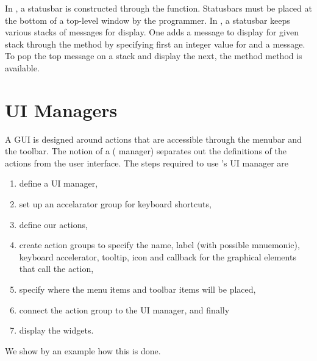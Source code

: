In \GTK, a statusbar is constructed through the
 function. Statusbars must be placed at the
bottom of a top-level window by the programmer. In \GTK, a statusbar
keeps various stacks of messages for display. One adds a message to
display for given stack through the  method
by specifying first an integer value for  and a
message. To pop the top message on a stack and display the next, the
method  method is available.


\section{UI Managers}
\label{sec:RGtk2:UIManager}


A GUI is designed around actions that are accessible through the
menubar and the toolbar. The notion of a 
( manager) separates out the definitions of the actions
from the user interface. The steps required to use \GTK's UI manager
are 
\begin{enumerate}
\item define a UI manager,
\item  set up an accelarator group for
keyboard shortcuts,
\item define our actions,
\item create action groups to
specify the name, label (with possible mnuemonic), keyboard
accelerator, tooltip, icon and callback for the graphical elements
that call the action,
\item specify where the menu items and toolbar
items will be placed,
\item connect the action group to the UI manager,
and finally
\item display the widgets.
\end{enumerate}

We show by an example how this is done. 

